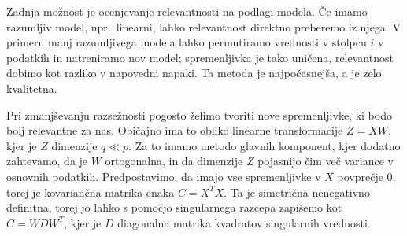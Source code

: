 
Zadnja možnost je ocenjevanje relevantnosti na podlagi modela.
Če imamo razumljiv model, npr.~linearni, lahko relevantnost direktno preberemo
iz njega.
V primeru manj razumljivega modela lahko permutiramo vrednosti v stolpcu $i$ v
podatkih in natreniramo nov model; spremenljivka je tako uničena, relevantnost
dobimo kot razliko v napovedni napaki.
Ta metoda je najpočasnejša, a je zelo kvalitetna.


Pri zmanjševanju razsežnosti pogosto želimo tvoriti nove spremenljivke, ki bodo
bolj relevantne za nas.
Običajno ima to obliko linearne transformacije $Z = X W$, kjer je $Z$ dimenzije
$q \ll p$.
Za to imamo metodo glavnih komponent, kjer dodatno zahtevamo, da je $W$
ortogonalna, in da dimenzije $Z$ pojasnijo čim več variance v osnovnih podatkih.
Predpostavimo, da imajo vse spremenljivke v $X$ povprečje $0$, torej je
kovariančna matrika enaka $C = X^T X$.
Ta je simetrična nenegativno definitna, torej jo lahko s pomočjo singularnega
razcepa zapišemo kot $C = W D W^T$, kjer je $D$ diagonalna matrika kvadratov
singularnih vrednosti.



